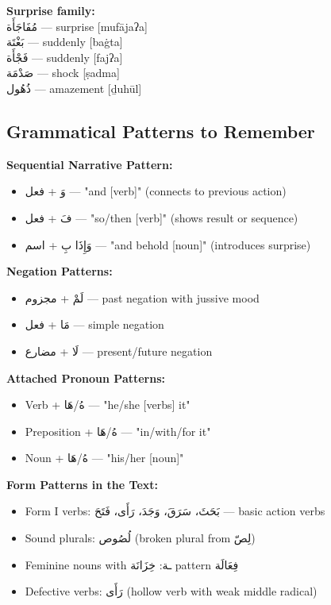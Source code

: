 \documentclass[letter,12pt]{article}
\begin{document}
\begin{multicols}{2}
\textbf{Surprise family:}\\
\textarabic{مُفَاجَأَة} — surprise [mufājaʔa]\\
\textarabic{بَغْتَة} — suddenly [baġta]\\
\textarabic{فَجْأَة} — suddenly [fajʔa]\\
\textarabic{صَدْمَة} — shock [ṣadma]\\
\textarabic{ذُهُول} — amazement [ḏuhūl]
\end{multicols}

\subsection{Grammatical Patterns to Remember}

\textbf{Sequential Narrative Pattern:}
\begin{itemize}
\item \textarabic{وَ + فعل} — "and [verb]" (connects to previous action)
\item \textarabic{فَ + فعل} — "so/then [verb]" (shows result or sequence)  
\item \textarabic{وَإِذَا بِ + اسم} — "and behold [noun]" (introduces surprise)
\end{itemize}

\textbf{Negation Patterns:}
\begin{itemize}
\item \textarabic{لَمْ + مجزوم} — past negation with jussive mood
\item \textarabic{مَا + فعل} — simple negation
\item \textarabic{لَا + مضارع} — present/future negation
\end{itemize}

\textbf{Attached Pronoun Patterns:}
\begin{itemize}
\item Verb + \textarabic{هُ/هَا} — "he/she [verbs] it"
\item Preposition + \textarabic{هُ/هَا} — "in/with/for it"
\item Noun + \textarabic{هُ/هَا} — "his/her [noun]"
\end{itemize}

\textbf{Form Patterns in the Text:}
\begin{itemize}
\item Form I verbs: \textarabic{بَحَثَ، سَرَقَ، وَجَدَ، رَأَى، فَتَحَ} — basic action verbs
\item Sound plurals: \textarabic{لُصُوص} (broken plural from \textarabic{لِصّ})
\item Feminine nouns with \textarabic{ـة}: \textarabic{خِزَانَة} pattern \textarabic{فِعَالَة}
\item Defective verbs: \textarabic{رَأَى} (hollow verb with weak middle radical)
\end{itemize}
\end{document}

